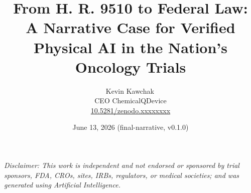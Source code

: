 \documentclass[11pt]{article}
\title{From H. R. 9510 to Federal Law:\\ A Narrative Case for Verified Physical AI in the Nation's Oncology Trials}
\author{Kevin Kawchak\,\orcidicon{0009-0007-5457-8667}\\ CEO ChemicalQDevice\\ \href{https://doi.org/10.5281/zenodo.xxxxxxxx}{10.5281/zenodo.xxxxxxxx}}
\date{June 13, 2026 \quad (final-narrative, v0.1.0)}
\begin{document}
\maketitle
\thispagestyle{empty}

\begin{abstract}

\end{abstract}

\vspace{0.2em}\noindent\footnotesize\textit{Disclaimer: This work is independent
and not endorsed or sponsored by trial sponsors, FDA, CROs, sites, IRBs,
regulators, or medical societies; and was generated using Artificial
Intelligence.}\normalsize\par




\tableofcontents
\vspace{0.3cm}










\clearpage


\clearpage
{}
\begingroup\raggedright\nocite{*}\endgroup


\end{document}
